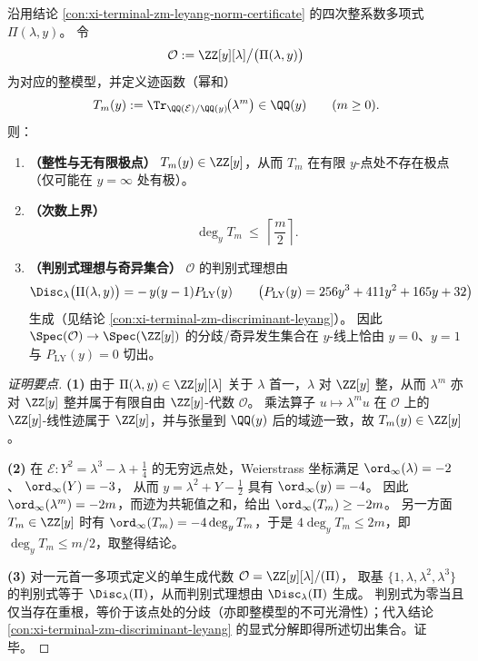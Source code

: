 \begin{conclusion}\label{con:xi-terminal-elliptic-trace-integrality-degree-discriminant-ideal}
沿用结论 \ref{con:xi-terminal-zm-leyang-norm-certificate} 的四次整系数多项式 \(\Pi(\lambda,y)\)。
令
\[
\mathcal{O}:=\ZZ[y][\lambda]\big/\bigl(\Pi(\lambda,y)\bigr)
\]
为对应的整模型，并定义迹函数（幂和）
\[
T_m(y):=\Tr_{\QQ(\mathcal{E})/\QQ(y)}\!\bigl(\lambda^{m}\bigr)\in\QQ(y)\qquad(m\ge 0).
\]
则：
\begin{enumerate}
  \item \textbf{（整性与无有限极点）}
        \(T_m(y)\in\ZZ[y]\)，从而 \(T_m\) 在有限 \(y\)-点处不存在极点（仅可能在 \(y=\infty\) 处有极）。
  \item \textbf{（次数上界）}
        \[
        \deg_y T_m\ \le\ \left\lceil\frac{m}{2}\right\rceil.
        \]
  \item \textbf{（判别式理想与奇异集合）}
        \(\mathcal{O}\) 的判别式理想由
        \[
        \Disc_{\lambda}\bigl(\Pi(\lambda,y)\bigr)=-\,y(y-1)P_{\mathrm{LY}}(y)
        \qquad
        \bigl(P_{\mathrm{LY}}(y)=256y^{3}+411y^{2}+165y+32\bigr)
        \]
        生成（见结论 \ref{con:xi-terminal-zm-discriminant-leyang}）。
        因此 \(\Spec(\mathcal{O})\to\Spec(\ZZ[y])\) 的分歧/奇异发生集合在 \(y\)-线上恰由
        \(y=0\)、\(y=1\) 与 \(P_{\mathrm{LY}}(y)=0\) 切出。
\end{enumerate}
\end{conclusion}
\begin{proof}[证明要点]
\textbf{(1)} 由于 \(\Pi(\lambda,y)\in\ZZ[y][\lambda]\) 关于 \(\lambda\) 首一，\(\lambda\) 对 \(\ZZ[y]\) 整，从而 \(\lambda^{m}\) 亦对 \(\ZZ[y]\) 整并属于有限自由 \(\ZZ[y]\)-代数 \(\mathcal{O}\)。
乘法算子 \(u\mapsto \lambda^{m}u\) 在 \(\mathcal{O}\) 上的 \(\ZZ[y]\)-线性迹属于 \(\ZZ[y]\)，并与张量到 \(\QQ(y)\) 后的域迹一致，故 \(T_m(y)\in\ZZ[y]\)。
\par
\textbf{(2)} 在 \(\mathcal{E}:Y^{2}=\lambda^{3}-\lambda+\tfrac14\) 的无穷远点处，Weierstrass 坐标满足
\(
\ord_{\infty}(\lambda)=-2
\)、
\(
\ord_{\infty}(Y)=-3
\)，
从而 \(y=\lambda^{2}+Y-\tfrac12\) 具有 \(\ord_{\infty}(y)=-4\)。
因此 \(\ord_{\infty}(\lambda^{m})=-2m\)，而迹为共轭值之和，给出
\(
\ord_{\infty}(T_m)\ge -2m
\)。
另一方面 \(T_m\in\ZZ[y]\) 时有 \(\ord_{\infty}(T_m)=-4\deg_y T_m\)，于是
\(
4\deg_y T_m\le 2m
\)，即 \(\deg_y T_m\le m/2\)，取整得结论。
\par
\textbf{(3)} 对一元首一多项式定义的单生成代数 \(\mathcal{O}=\ZZ[y][\lambda]/(\Pi)\)，
取基 \(\{1,\lambda,\lambda^{2},\lambda^{3}\}\) 的判别式等于 \(\Disc_{\lambda}(\Pi)\)，从而判别式理想由 \(\Disc_{\lambda}(\Pi)\) 生成。
判别式为零当且仅当存在重根，等价于该点处的分歧（亦即整模型的不可光滑性）；代入结论 \ref{con:xi-terminal-zm-discriminant-leyang} 的显式分解即得所述切出集合。证毕。
\end{proof}

